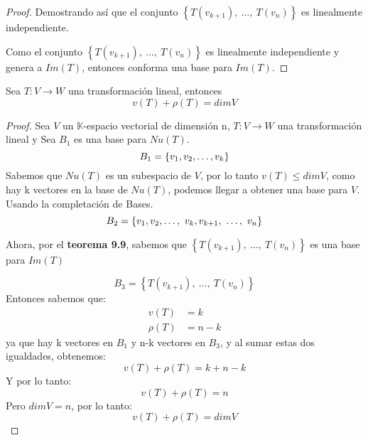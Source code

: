 \begin{proof}
Demostrando así que el conjunto $\left\{T(v_{k+1}),\ \hdots,\ T(v_n) \right\}$ es linealmente independiente.


Como el conjunto $\left\{T(v_{k+1}),\ \hdots,\ T(v_n) \right\}$ es linealmente independiente y genera a $Im(T)$, entonces conforma una base para $Im(T)$.
\end{proof}

\begin{theorem}
Sea $T: V \to W$ una transformación lineal, entonces $$v(T) + \rho(T) = dimV$$
\end{theorem}
\begin{proof}
Sea $V$ un $\mathbb{K}$-espacio vectorial de dimensión n, $T: V \to W$ una transformación lineal y Sea $B_{1}$ es una base para $Nu(T)$.
$$B_1 =  \lbrace v_1, v_2, \ldots, v_k \rbrace$$
Sabemos que $Nu(T)$ es un subespacio de $V$, por lo tanto $v\left(T\right)\le dimV$,
como hay k vectores en la base de $Nu(T)$, podemos llegar a obtener una base para $V$. Usando la completación de Bases.
$$B_2 = \left\{v_1,v_2, \hdots ,\ v_k,v_{k+1},\ \hdots,\ v_n \right\} $$

Ahora, por el \textbf{teorema 9.9}, sabemos que $\left\{T(v_{k+1}),\ \hdots,\ T(v_n) \right\}$ es una base para $Im(T)$

$$ B_3 = \left\{T(v_{k+1}),\ \hdots,\ T(v_n) \right\}$$
Entonces sabemos que:
\begin{align*}
    v(T) &= k\\
    \rho(T) &= n-k
\end{align*}
ya que hay k vectores en $B_1$ y n-k vectores en $B_3$, y al sumar estas dos igualdades, obtenemos:
$$ v(T) + \rho(T) = k + n - k$$
Y por lo tanto:
$$v(T) + \rho(T) = n$$
Pero $dimV = n$, por lo tanto:
$$ v(T) + \rho(T) = dimV$$
\end{proof}

\newpage

